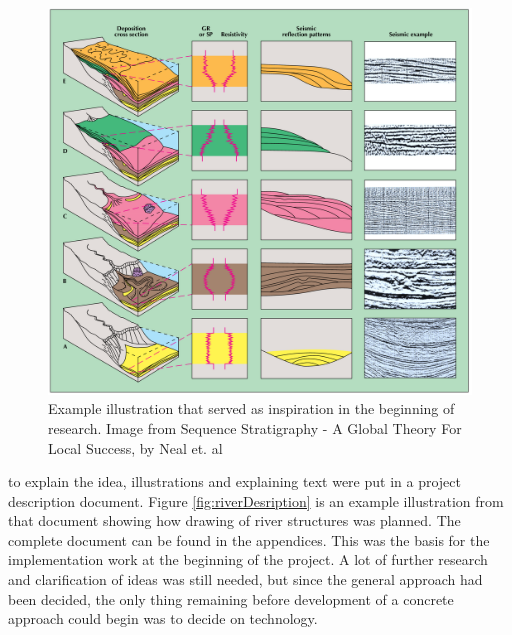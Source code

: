 \documentclass[a4paper,12pt]{report}
\begin{document}

\begin{figure}
 \includegraphics[width=\linewidth]{thesis/inspiration1.png}
 \caption{Example illustration that served as inspiration in the beginning of research. Image from Sequence Stratigraphy - A Global Theory For Local Success, by Neal et. al}
 \label{fig:inspiration1}
\end{figure}


to explain the idea, illustrations and explaining text were put in a project description document. Figure \ref{fig:riverDesription} is an example illustration from that document showing how drawing of river structures was planned. The complete document can be found in the appendices. This was the basis for the implementation work at the beginning of the project. A lot of further research and clarification of ideas was still needed, but since the general approach had been decided, the only thing remaining before development of a concrete approach could begin was to decide on technology.
\end{document}
